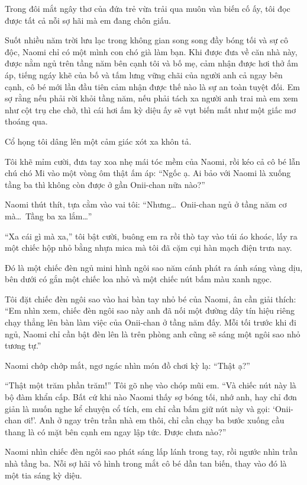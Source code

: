 ﻿\documentclass[../main.tex]{subfiles}
\begin{document}
Trong đôi mắt ngây thơ của đứa trẻ vừa trải qua muôn vàn biến cố ấy, tôi đọc được tất cả nỗi sợ hãi mà em đang chôn giấu.

Suốt nhiều năm trời lưu lạc trong không gian song song đầy bóng tối và sự cô độc, Naomi chỉ có một mình con chó già làm bạn. Khi được đưa về căn nhà này, được nằm ngủ trên tầng năm bên cạnh tôi và bố mẹ, cảm nhận được hơi thở ấm áp, tiếng ngáy khẽ của bố và tấm lưng vững chãi của người anh cả ngay bên cạnh, cô bé mới lần đầu tiên cảm nhận được thế nào là sự an toàn tuyệt đối. Em sợ rằng nếu phải rời khỏi tầng năm, nếu phải tách xa người anh trai mà em xem như cột trụ che chở, thì cái hơi ấm kỳ diệu ấy sẽ vụt biến mất như một giấc mơ thoáng qua.

Cổ họng tôi dâng lên một cảm giác xót xa khôn tả.

Tôi khẽ mỉm cười, đưa tay xoa nhẹ mái tóc mềm của Naomi, rồi kéo cả cô bé lẫn chú chó Mi vào một vòng ôm thật ấm áp: ``Ngốc ạ. Ai bảo với Naomi là xuống tầng ba thì không còn được ở gần Onii-chan nữa nào?''

Naomi thút thít, tựa cằm vào vai tôi: ``Nhưng\dots\ Onii-chan ngủ ở tầng năm cơ mà\dots\ Tầng ba xa lắm\dots''

``Xa cái gì mà xa,'' tôi bật cười, buông em ra rồi thò tay vào túi áo khoác, lấy ra một chiếc hộp nhỏ bằng nhựa mica mà tôi đã cặm cụi hàn mạch điện trưa nay.

Đó là một chiếc đèn ngủ mini hình ngôi sao năm cánh phát ra ánh sáng vàng dịu, bên dưới có gắn một chiếc loa nhỏ và một chiếc nút bấm màu xanh ngọc.

Tôi đặt chiếc đèn ngôi sao vào hai bàn tay nhỏ bé của Naomi, ân cần giải thích: ``Em nhìn xem, chiếc đèn ngôi sao này anh đã nối một đường dây tín hiệu riêng chạy thẳng lên bàn làm việc của Onii-chan ở tầng năm đấy. Mỗi tối trước khi đi ngủ, Naomi chỉ cần bật đèn lên là trên phòng anh cũng sẽ sáng một ngôi sao nhỏ tương tự.''

Naomi chớp chớp mắt, ngơ ngác nhìn món đồ chơi kỳ lạ: ``Thật ạ?''

``Thật một trăm phần trăm!'' Tôi gõ nhẹ vào chóp mũi em. ``Và chiếc nút này là bộ đàm khẩn cấp. Bất cứ khi nào Naomi thấy sợ bóng tối, nhớ anh, hay chỉ đơn giản là muốn nghe kể chuyện cổ tích, em chỉ cần bấm giữ nút này và gọi: `Onii-chan ơi!'. Anh ở ngay trên trần nhà em thôi, chỉ cần chạy ba bước xuống cầu thang là có mặt bên cạnh em ngay lập tức. Được chưa nào?''

Naomi nhìn chiếc đèn ngôi sao phát sáng lấp lánh trong tay, rồi ngước nhìn trần nhà tầng ba. Nỗi sợ hãi vô hình trong mắt cô bé dần tan biến, thay vào đó là một tia sáng kỳ diệu.
\end{document}
